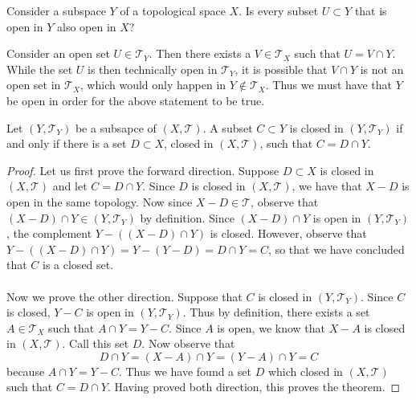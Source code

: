 \documentclass[a4paper,12pt,twoside]{hmcpset}
\begin{document}
\begin{exercise}[Exercise 4.27]
Consider a subspace $Y$ of a topological space $X$. Is every subset $U
\subset Y$ that is open in $Y$ also open in $X$? 
\end{exercise}

\begin{solution}
Consider an open set $U \in \mathscr{T}_Y$. Then there exists a $V \in
\mathscr{T}_X$ such that $U = V \cap Y$. While the set $U$ is then
technically open in $\mathscr{T}_Y$, it is possible that $V \cap Y$ is
not an open set in $\mathscr{T}_X$, which would only happen in $Y \notin
\mathscr{T}_X.$ Thus we must have that $Y$ be open in order for the
above statement to be true. 
\end{solution}

\begin{problem}[Theorem 4.28] Let $(Y, \mathscr{T}_Y)$ be a subsapce
    of $(X, \mathscr{T})$. A subset $C \subset Y$ is closed in $(Y,
    \mathscr{T}_Y)$ if and only if there is a set $D \subset X$,
    closed in $(X, \mathscr{T})$, such that $C = D \cap Y$.
\end{problem}

\begin{proof}
    Let us first prove the forward direction. Suppose
    $D \subset X$ is closed in $(X, \mathscr{T})$ and let $C
    = D \cap Y$. Since $D$ is closed in $(X, \mathscr{T})$, we have
    that $X - D$ is open in the same topology. Now since $X - D \in
    \mathscr{T}$, observe that $(X - D) \cap Y \in (Y, \mathscr{T}_Y)$
    by definition. Since $(X - D) \cap Y$ is open in $(Y,
    \mathscr{T}_Y)$, the complement $Y - ((X - D)
    \cap Y)$ is closed. However, observe that $Y - ((X - D) \cap Y)= Y
    - (Y - D) = D \cap Y = C$, so that we have concluded that $C$ is a
    closed set. \\
    \\
    Now we prove the other direction. Suppose that $C$ is closed
    in $(Y, \mathscr{T}_Y)$. Since $C$ is closed, $Y - C$ is open
    in $(Y, \mathscr{T}_Y)$. Thus by definition, there exists a
    set $A \in \mathscr{T}_X$ such that $A \cap Y = Y - C$. Since
    $A$ is open, we know that $X - A$ is closed in $(X, \mathscr{T})$.
    Call this set $D$. Now observe that 
    $$D \cap Y = (X - A) \cap Y = (Y - A) \cap Y = C$$ because $A \cap Y
    = Y - C$. Thus we have found a set $D$ which closed in $(X,
    \mathscr{T})$ such that $C = D \cap Y$. Having proved both
    direction, this proves the theorem. 
\end{proof}
\end{document}
